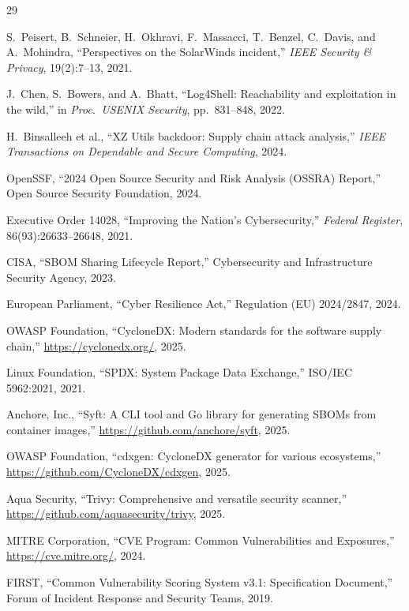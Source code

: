 \documentclass[11pt,twocolumn]{article}
\begin{document}
\begin{thebibliography}{29}

S.\ Peisert, B.\ Schneier, H.\ Okhravi, F.\ Massacci, T.\ Benzel, C.\ Davis,
and A.\ Mohindra,
``Perspectives on the SolarWinds incident,''
\emph{IEEE Security \& Privacy}, 19(2):7--13, 2021.

J.\ Chen, S.\ Bowers, and A.\ Bhatt,
``Log4Shell: Reachability and exploitation in the wild,''
in \emph{Proc.\ USENIX Security}, pp.\ 831--848, 2022.

H.\ Binsalleeh et al.,
``XZ Utils backdoor: Supply chain attack analysis,''
\emph{IEEE Transactions on Dependable and Secure Computing}, 2024.

OpenSSF,
``2024 Open Source Security and Risk Analysis (OSSRA) Report,''
Open Source Security Foundation, 2024.

Executive Order 14028,
``Improving the Nation's Cybersecurity,''
\emph{Federal Register}, 86(93):26633--26648, 2021.

CISA,
``SBOM Sharing Lifecycle Report,''
Cybersecurity and Infrastructure Security Agency, 2023.

European Parliament,
``Cyber Resilience Act,'' Regulation (EU) 2024/2847, 2024.

OWASP Foundation,
``CycloneDX: Modern standards for the software supply chain,''
\url{https://cyclonedx.org/}, 2025.

Linux Foundation,
``SPDX: System Package Data Exchange,''
ISO/IEC 5962:2021, 2021.

Anchore, Inc.,
``Syft: A CLI tool and Go library for generating SBOMs from container images,''
\url{https://github.com/anchore/syft}, 2025.

OWASP Foundation,
``cdxgen: CycloneDX generator for various ecosystems,''
\url{https://github.com/CycloneDX/cdxgen}, 2025.

Aqua Security,
``Trivy: Comprehensive and versatile security scanner,''
\url{https://github.com/aquasecurity/trivy}, 2025.

MITRE Corporation,
``CVE Program: Common Vulnerabilities and Exposures,''
\url{https://cve.mitre.org/}, 2024.

FIRST,
``Common Vulnerability Scoring System v3.1: Specification Document,''
Forum of Incident Response and Security Teams, 2019.


\end{thebibliography}
\end{document}
